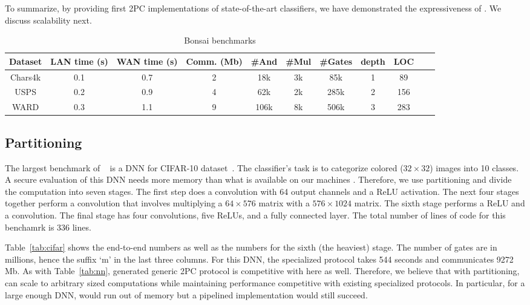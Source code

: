 To summarize, by providing first 2PC implementations of
state-of-the-art classifiers, we have demonstrated the expressiveness
of \tool. We discuss scalability next.


\begin{table*}
\begin{tabular}{c|c|c|c |c|c|c|c|c|c | c}
Dataset       & LAN time (s) & WAN time (s) & Comm. (Mb)  & \#And & \#Mul & \#Gates & depth & LOC\\
\hline
Chars4k    &  0.1         & 0.7         & 2            & 18k    & 3k    &  85k     & 1   & 89\\
\hline
USPS       &  0.2         & 0.9         & 4            & 62k    & 2k    &  285k    & 2   & 156\\
\hline
WARD       &  0.3         & 1.1         & 9            & 106k    & 8k    &  506k    & 3   & 283\\
\hline
\end{tabular}

 \caption{Bonsai benchmarks}
 \label{tab:bonsai} 
\end{table*}

\subsection{Partitioning}
\label{sec:pipeeval}
The largest benchmark of \minion~\cite{minionn} is a DNN for CIFAR-10
dataset~\cite{cifar}. 
The classifier's task is to categorize colored ($32\times 32$) images
into 10 classes. A secure evaluation of this DNN needs more memory
than what is available
on our machines . Therefore, we use partitioning and divide the
computation into seven stages. 
The first step does a convolution with 64 output channels and a ReLU
activation. The next four stages together perform a convolution that
involves multiplying a $64\times 576$ matrix with a 
$576\times 1024$ matrix. The sixth stage performs a ReLU and a
convolution. The final stage has four convolutions, five ReLUs, and a
fully connected layer. The total number of lines of \tool code for
this benchamrk is 336 lines. 


Table~\ref{tab:cifar} shows the end-to-end numbers as
well as the numbers for the sixth (the heaviest) stage. 
The number of gates are in millions, hence the suffix `m' in the last
three columns.
For this DNN, the specialized \minion protocol takes 544 seconds and
communicates 9272 Mb.
As with Table~\ref{tab:nn}, \tool generated generic 2PC protocol is
competitive with \minion here as well. Therefore,
we believe that with partitioning, \tool can scale to arbitrary sized
computations while maintaining performance
competitive with existing specialized protocols. In particular, for a
large enough DNN, \minion would run
out of memory but a pipelined \tool implementation would still
succeed. 

